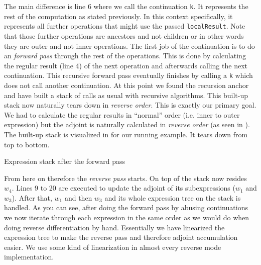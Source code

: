 The main difference is line 6 where we call the continuation \lstinline{k}. It represents the rest of the computation as stated previously. In this context specifically, it represents all further operations that might use the passed \lstinline{localResult}. Note that those further operations are ancestors and not children or in other words they are outer and not inner operations. The first job of the continuation is to do an \emph{forward pass} through the rest of the operations. This is done by calculating the regular result (line 4) of the next operation and afterwards calling the next continuation. This recursive forward pass eventually finishes by calling a \lstinline{k} which does not call another continuation. At this point we found the recursion anchor and have built a stack of calls as usual with recursive algorithms. This built-up stack now naturally tears down in \emph{reverse order}. This is exactly our primary goal. We had to calculate the regular results in ``normal'' order (i.e. inner to outer expression) but the adjoint is naturally calculated in \emph{reverse order} (as seen in ). The built-up stack is visualized in  for our running example. It tears down from top to bottom.
\begin{center}


    \captionsetup{type=figure}
    \caption{Expression stack after the forward pass}
    \label{fig:stack}
\end{center}
From here on therefore the \emph{reverse pass} starts. On top of the stack now resides $w_4$. Lines 9 to 20 are executed to update the adjoint of its subexpressions ($w_1$ and $w_3$). After that, $w_1$ and then $w_3$ and its whole expression tree on the stack is handled. As you can see, after doing the forward pass by abusing continuations we now iterate through each expression in the same order as we would do when doing reverse differentiation by hand. Essentially we have linearized the expression tree to make the reverse pass and therefore adjoint accumulation easier. We use some kind of linearization in almost every reverse mode implementation.

